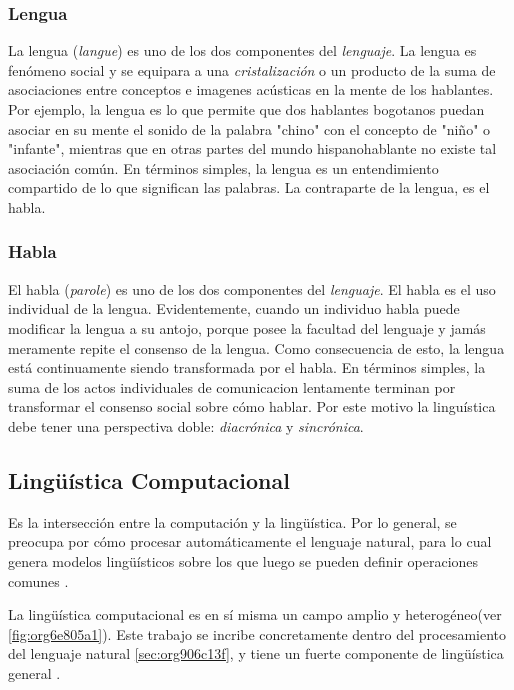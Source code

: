 \documentclass[12pt,letterpaper,twoside]{article}
\begin{document}
\subsubsection{Lengua}
\label{sec:orgf2d7eef}

La lengua (\emph{langue}) es uno de los dos componentes del
\emph{lenguaje}.  La lengua es fenómeno social y se equipara a una
\emph{cristalización} o un producto de la suma de asociaciones entre
conceptos e imagenes acústicas en la mente de los hablantes. Por
ejemplo, la lengua es lo que permite que dos hablantes bogotanos
puedan asociar en su mente el sonido de la palabra "chino" con el
concepto de "niño" o "infante", mientras que en otras partes del
mundo hispanohablante no existe tal asociación común.
En términos simples, la lengua es un entendimiento compartido de
lo que significan las palabras. La contraparte de la lengua,
es el habla. 

\subsubsection{Habla}
\label{sec:orge17bdb2}
El habla (\emph{parole}) es uno de los dos componentes del
\emph{lenguaje}. El habla es el uso individual de la lengua.
Evidentemente, cuando un individuo habla puede modificar
la lengua a su antojo, porque posee la facultad del
lenguaje y jamás meramente repite el consenso de la lengua.
Como consecuencia de esto, la lengua está continuamente
siendo transformada por el habla. En términos simples,
la suma de los actos individuales de comunicacion lentamente
terminan por transformar el consenso social sobre cómo
hablar.  Por este motivo la linguística debe tener una
perspectiva doble: \emph{diacrónica} y \emph{sincrónica}.


\subsection{Lingüística Computacional}
\label{sec:org335926d}

Es la intersección entre la computación y la lingüística. Por lo
general, se preocupa por cómo procesar automáticamente el
lenguaje natural, para lo cual genera modelos lingüísticos sobre los
que luego se pueden definir operaciones comunes \cite{gelbukh2004}.


La lingüística computacional es en sí misma un campo amplio y
heterogéneo(ver \ref{fig:org6e805a1}).
Este trabajo se incribe concretamente dentro del procesamiento
del lenguaje natural \ref{sec:org906c13f}, y tiene un fuerte componente de
lingüística general .
\end{document}
